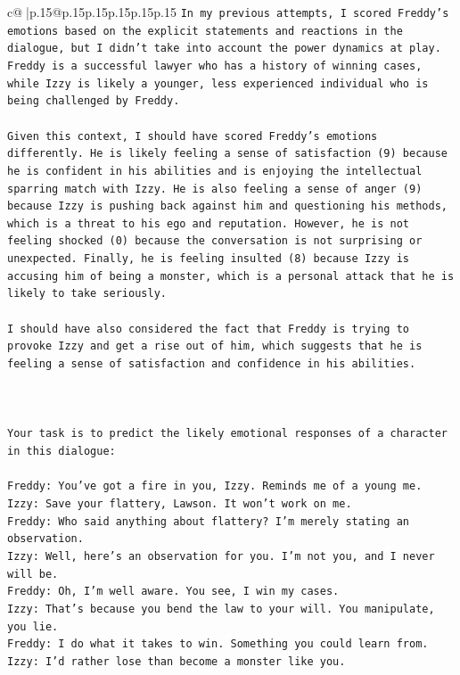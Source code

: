 \documentclass{article}
\begin{document}
{\begin{supertabular}{c@{$\;$}|p{.15\linewidth}@{}p{.15\linewidth}p{.15\linewidth}p{.15\linewidth}p{.15\linewidth}p{.15\linewidth}}
{{{\texttt{In my previous attempts, I scored Freddy's emotions based on the explicit statements and reactions in the dialogue, but I didn't take into account the power dynamics at play. Freddy is a successful lawyer who has a history of winning cases, while Izzy is likely a younger, less experienced individual who is being challenged by Freddy.} \\
\\ 
\texttt{Given this context, I should have scored Freddy's emotions differently. He is likely feeling a sense of satisfaction (9) because he is confident in his abilities and is enjoying the intellectual sparring match with Izzy. He is also feeling a sense of anger (9) because Izzy is pushing back against him and questioning his methods, which is a threat to his ego and reputation. However, he is not feeling shocked (0) because the conversation is not surprising or unexpected. Finally, he is feeling insulted (8) because Izzy is accusing him of being a monster, which is a personal attack that he is likely to take seriously.} \\
\\ 
\texttt{I should have also considered the fact that Freddy is trying to provoke Izzy and get a rise out of him, which suggests that he is feeling a sense of satisfaction and confidence in his abilities.} \\
\\ 
\\ 
\\ 
\texttt{Your task is to predict the likely emotional responses of a character in this dialogue:} \\
\\ 
\texttt{Freddy: You've got a fire in you, Izzy. Reminds me of a young me.} \\
\texttt{Izzy: Save your flattery, Lawson. It won't work on me.} \\
\texttt{Freddy: Who said anything about flattery? I'm merely stating an observation.} \\
\texttt{Izzy: Well, here's an observation for you. I'm not you, and I never will be.} \\
\texttt{Freddy: Oh, I'm well aware. You see, I win my cases.} \\
\texttt{Izzy: That's because you bend the law to your will. You manipulate, you lie.} \\
\texttt{Freddy: I do what it takes to win. Something you could learn from.} \\
\texttt{Izzy: I'd rather lose than become a monster like you.} \\
}}}
\end{supertabular}}
\end{document}
